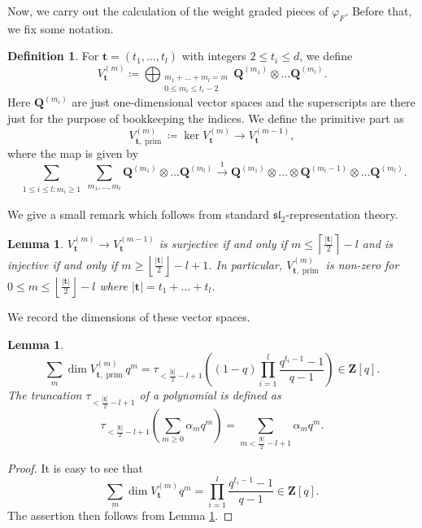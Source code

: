 \documentclass[letterpaper,11pt]{amsart}
\theoremstyle{plain}
\newtheorem{lemm}[theo]{Lemma}
\theoremstyle{definition}
\newtheorem{defi}[theo]{Definition}
\theoremstyle{remark}
\newcommand{\QQ}{\mathbf{Q}}
\newcommand{\ZZ}{\mathbf{Z}}
\newcommand{\uind}[1]{^{(#1)}}
\newcommand{\uround}[1]{\left\lceil #1 \right\rceil }
\newcommand{\lround}[1]{\left\lfloor #1 \right\rfloor}
\DeclareMathOperator{\prim}{prim}
\newcommand{\bft}{\mathbf{t}}
\begin{document}
 

    Now, we carry out the calculation of the weight graded pieces of $\varphi_{F}$. Before that, we fix some notation.

    \begin{defi} \label{defi:linear-map-V_t}
        For $\bft = (t_{1},\ldots, t_{l})$ with integers $2 \leq t_{i} \leq d$, we define
    $$ V_{\mathbf{t}}\uind{m} \coloneqq \bigoplus_{\substack{m_{1}+\ldots + m_{l} = m \\ 0 \leq m_{i} \leq t_{i}-2}} \QQ\uind{m_{1}} \otimes \ldots \QQ\uind{m_{l}}.$$
    Here $\QQ\uind{m_{i}}$ are just one-dimensional vector spaces and the superscripts are there just for the purpose of bookkeeping the indices. We define the primitive part as
     $$ V_{\bft, \prim}\uind{m} \coloneqq \ker V_{\bft}\uind{m} \to V_{\bft}\uind{m-1},$$
     where the map is given by
     $$ \sum_{\substack{1 \leq i \leq l : m_{i} \geq 1}}\sum_{m_{1},\ldots, m_{l}} \QQ\uind{m_{1}} \otimes \ldots \QQ\uind{m_{l}} \xrightarrow{1} \QQ\uind{m_{1}}\otimes \ldots \otimes \QQ\uind{m_{i}-1} \otimes \ldots \QQ\uind{m_{l}}.$$
    \end{defi}

     We give a small remark which follows from standard $\mathfrak{sl}_{2}$-representation theory.
     \begin{lemm} \label{lemm:inj-surj-of-V-uind(m)}
         $V_{\bft}\uind{m} \to V_{\bft}\uind{m-1}$ is surjective if and only if $m \leq \uround{\frac{|\bft|}{2}} - l$ and is injective if and only if $m \geq \lround{\frac{|\bft|}{2}} - l + 1$. In particular, $V_{\bft,\prim}\uind{m}$ is non-zero for $0 \leq m \leq \lround{\frac{|\bft|}{2}}-l$ where $|\bft|= t_{1}+ \ldots + t_{l}$.
     \end{lemm}

     We record the dimensions of these vector spaces.

     \begin{lemm} \label{lemm:dimension-of-Vt-prim}
         $$ \sum_{m} \dim V_{\bft, \prim}\uind{m} q^m = \tau_{<\frac{|\bft|}{2}-l+1} \left( (1-q) \prod_{i=1}^{l} \frac{q^{t_{i}-1}-1}{q-1} \right) \in \ZZ[q].$$
         The truncation $\tau_{<\frac{|\bft|}{2}-l+1}$ of a polynomial is defined as
         $$ \tau_{<\frac{|\bft|}{2}-l+1} \left( \sum_{m \geq 0} \alpha_{m} q^{m} \right) = \sum_{m < \frac{|\bft|}{2}-l+1} \alpha_{m}q^{m}.$$
     \end{lemm}
     \begin{proof}
         It is easy to see that
         $$ \sum_{m} \dim V_{\bft}\uind{m} q^{m} = \prod_{i=1}^{l} \frac{q^{t_{i}-1}-1}{q-1} \in \ZZ[q].$$
         The assertion then follows from Lemma \ref{lemm:inj-surj-of-V-uind(m)}.
     \end{proof}
\end{document}

